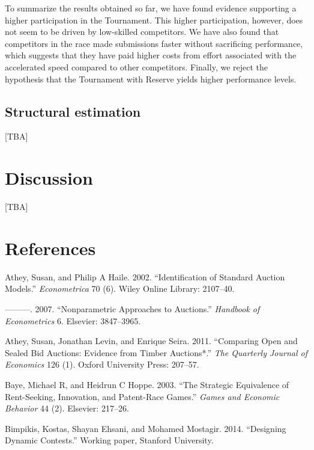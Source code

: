 \documentclass[11pt, titlepage]{article}
\begin{document}
To summarize the results obtained so far, we have found evidence
supporting a higher participation in the Tournament. This higher
participation, however, does not seem to be driven by low-skilled
competitors. We have also found that competitors in the race made
submissions faster without sacrificing performance, which suggests that
they have paid higher costs from effort associated with the accelerated
speed compared to other competitors. Finally, we reject the hypothesis
that the Tournament with Reserve yields higher performance levels.

\subsection{Structural estimation}\label{structural-estimation}

{[}TBA{]}

\section{Discussion}\label{discussion}

{[}TBA{]}

\section*{References}\label{references}

\hypertarget{refs}{}
\hypertarget{ref-athey2002identification}{}
Athey, Susan, and Philip A Haile. 2002. ``Identification of Standard
Auction Models.'' \emph{Econometrica} 70 (6). Wiley Online Library:
2107--40.

\hypertarget{ref-athey2007nonparametric}{}
---------. 2007. ``Nonparametric Approaches to Auctions.''
\emph{Handbook of Econometrics} 6. Elsevier: 3847--3965.

\hypertarget{ref-athey2011comparing}{}
Athey, Susan, Jonathan Levin, and Enrique Seira. 2011. ``Comparing Open
and Sealed Bid Auctions: Evidence from Timber Auctions*.'' \emph{The
Quarterly Journal of Economics} 126 (1). Oxford University Press:
207--57.

\hypertarget{ref-baye2003strategic}{}
Baye, Michael R, and Heidrun C Hoppe. 2003. ``The Strategic Equivalence
of Rent-Seeking, Innovation, and Patent-Race Games.'' \emph{Games and
Economic Behavior} 44 (2). Elsevier: 217--26.

\hypertarget{ref-bimpikis2014designing}{}
Bimpikis, Kostas, Shayan Ehsani, and Mohamed Mostagir. 2014. ``Designing
Dynamic Contests.'' Working paper, Stanford University.
\end{document}
